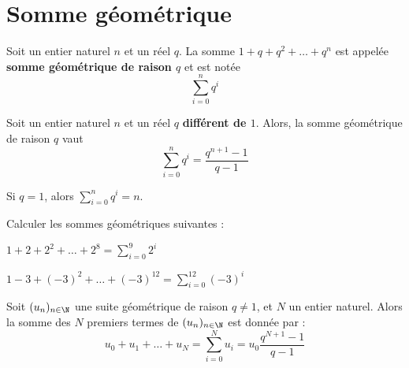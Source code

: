 \documentclass{article}
\begin{document}
\section{Somme géométrique}
\begin{definition}
Soit un entier naturel $n$ et un réel $q$. La somme $1 + q + q^2 + \dots + q^n$ est appelée \textbf{somme géométrique de raison $q$} et est notée
\begin{equation*}
\sum_{i=0}^n q^i
\end{equation*}
\begin{proposition}
Soit un entier naturel $n$ et un réel $q$ \textbf{différent de $1$}. Alors, la somme géométrique de raison $q$ vaut
\begin{equation*}
\sum_{i=0}^n q^i = \dfrac{q^{n+1} - 1}{q - 1}
\end{equation*}
\end{proposition}
\begin{remark}
Si $q = 1$, alors $\sum_{i = 0}^n q^i = n$.
\end{remark}
\begin{example}
Calculer les sommes géométriques suivantes :
\begin{enumquestions}
\item $1 + 2 + 2^2 + \dots + 2^8 = \sum_{i=0}^9 2^i$ \answersline
\item $1 - 3 + (-3)^2 + \dots + (-3)^12 = \sum_{i = 0}^12 (-3)^i$
\end{enumquestions}
\end{example}
\begin{proposition}
Soit $(u_n)_{n \in \N}$ une suite géométrique de raison $q \neq 1$, et $N$ un entier naturel. Alors la somme des $N$ premiers termes de $(u_n)_{n \in \N}$ est donnée par :
\begin{equation*}
u_0 + u_1 + \dots + u_N = \sum_{i = 0}^{N} u_i = u_0 \dfrac{q^{N + 1} - 1}{q - 1}
\end{equation*}
\end{proposition}
\end{definition}
\end{document}
